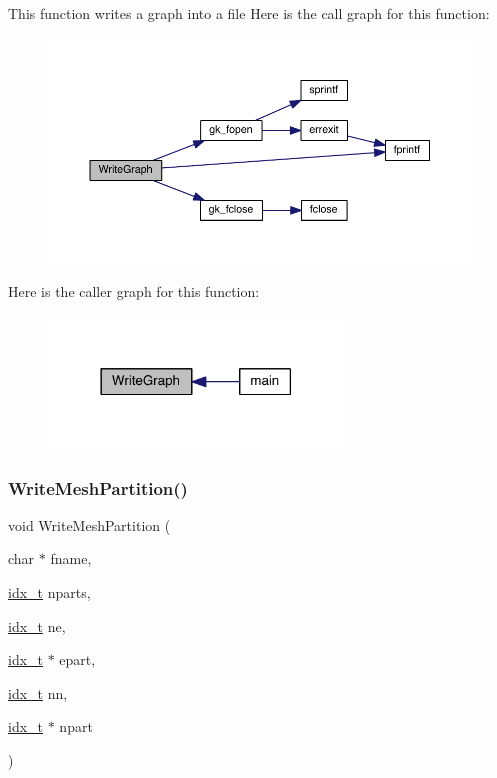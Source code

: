 This function writes a graph into a file Here is the call graph for this function\+:\nopagebreak
\begin{figure}[H]
\begin{center}
\leavevmode
\includegraphics[width=350pt]{a00948_a91b3b24f2b508da8f2e2df7bc2c94cc6_cgraph}
\end{center}
\end{figure}
Here is the caller graph for this function\+:\nopagebreak
\begin{figure}[H]
\begin{center}
\leavevmode
\includegraphics[width=222pt]{a00948_a91b3b24f2b508da8f2e2df7bc2c94cc6_icgraph}
\end{center}
\end{figure}
\mbox{\label{a00948_ac8ce682e47fbcfad378ee4100ab091ca}} 
\subsubsection{\texorpdfstring{Write\+Mesh\+Partition()}{WriteMeshPartition()}}
{\footnotesize\ttfamily void Write\+Mesh\+Partition (\begin{DoxyParamCaption}\item[{char $\ast$}]{fname,  }\item[{\hyperlink{a00876_aaa5262be3e700770163401acb0150f52}{idx\+\_\+t}}]{nparts,  }\item[{\hyperlink{a00876_aaa5262be3e700770163401acb0150f52}{idx\+\_\+t}}]{ne,  }\item[{\hyperlink{a00876_aaa5262be3e700770163401acb0150f52}{idx\+\_\+t} $\ast$}]{epart,  }\item[{\hyperlink{a00876_aaa5262be3e700770163401acb0150f52}{idx\+\_\+t}}]{nn,  }\item[{\hyperlink{a00876_aaa5262be3e700770163401acb0150f52}{idx\+\_\+t} $\ast$}]{npart }\end{DoxyParamCaption})}

